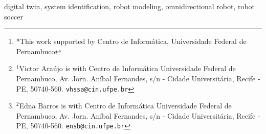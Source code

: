 \documentclass[conference,a4paper]{IEEEtran}
\begin{document}
\author{Victor Araújo$^{1}$ and Edna Barros$^{2}$%
\thanks{*This work supported by Centro de Informática, Universidade Federal de Pernambuco}%
\thanks{$^{1}$Victor Araújo is with Centro de Informática
        Universidade Federal de Pernambuco, Av. Jorn. Aníbal Fernandes, s/n - Cidade Universitária, Recife - PE, 50740-560.
        {\tt\small vhssa@cin.ufpe.br}}%
\thanks{$^{2}$Edna Barros is with Centro de Informática
        Universidade Federal de Pernambuco, Av. Jorn. Aníbal Fernandes, s/n - Cidade Universitária, Recife - PE, 50740-560.
        {\tt\small ensb@cin.ufpe.br}}%
}

\maketitle



\begin{IEEEkeywords}
digital twin, system identification, robot modeling, omnidirectional robot, robot soccer
\end{IEEEkeywords}










\end{document}
